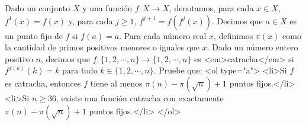 Dado un conjunto $X$ y una función $f : X \rightarrow X$, denotamos, para cada $x \in X$, $f^1(x) = f(x)$ y, para cada $j \geq 1$, $f^{j+1} = f(f^j(x))$. Decimos que $a \in X$ es un punto fijo de $f$ si $f(a) = a$. Para cada número real $x$, definimos $\pi (x)$ como la cantidad de primos positivos menores o iguales que $x$. Dado un número entero positivo $n$, decimos que $f : \{ 1,2, \cdots , n \} \rightarrow \{ 1,2, \cdots , n \}$ es <em>catracha</em> si $f^{f(k)}(k) = k$ para todo $k \in \{ 1,2, \cdots ,n\}$. Pruebe que:
<ol type="a">
  <li>Si $f$ es catracha, entonces $f$ tiene al menos $\pi (n)- \pi (\sqrt{n})+1$ puntos fijos.</li>
  <li>Si $n \geq 36$, existe una función catracha con exactamente $\pi (n) - \pi (\sqrt{n})+1$ puntos fijos.</li>
</ol>
